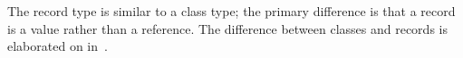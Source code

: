 The record type is similar to a class type; the primary difference is
that a record is a value rather than a reference.  The difference
between classes and records is elaborated on in~.
